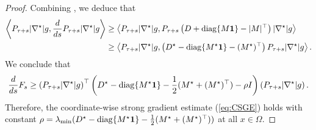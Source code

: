 \begin{proof}
    Combining , 
    we deduce that
    \begin{align*}
        \left\langle P_{\tau+s} |\nabla^\star| g,\frac{d}{ds} P_{\tau+s} |\nabla^\star| g\right\rangle
        &\geq \left\langle P_{\tau+s} |\nabla^\star| g,P_{\tau+s} \left( D + \mathrm{diag}\{M\boldsymbol{1}\} - |M|^\top \right) |\nabla^\star| g\right\rangle
        \\&\geq \left\langle P_{\tau+s} |\nabla^\star| g, \left( D^\star - \mathrm{diag}\{M^\star\boldsymbol{1}\} -( M^\star)^\top \right) P_{\tau+s}|\nabla^\star| g\right\rangle.
    \end{align*}
    We conclude that 
    $$
        \frac{d}{ds}F_s \geq \left(P_{\tau+s} |\nabla^\star| g\right)^\top\left(D^\star - \mathrm{diag}\{M^\star\boldsymbol{1}\}-\frac{1}{2}(M^\star+(M^\star)^\top) - \rho I\right)\left(P_{\tau+s} |\nabla^\star| g\right) .
    $$
    Therefore, the coordinate-wise strong gradient estimate (\ref{eq:CSGE}) holds with constant $\rho = \lambda_{\min}(D^\star-\mathrm{diag}\{M^\star\boldsymbol{1}\} - \frac{1}{2}(M^\star+(M^\star)^\top))$ at all $x \in \Omega$.
\end{proof}

